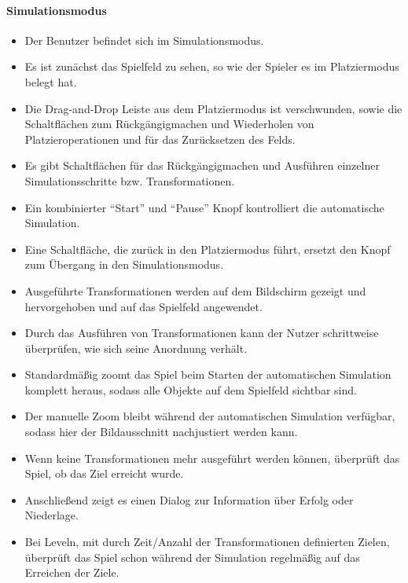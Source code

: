 \paragraph{Simulationsmodus}\mbox{}\newline
\begin{itemize}
\item Der Benutzer befindet sich im Simulationsmodus.
\item Es ist zunächst das Spielfeld zu sehen, so wie der Spieler es im Platziermodus belegt hat.
\item Die Drag-and-Drop Leiste aus dem Platziermodus ist verschwunden, sowie die 
Schaltflächen zum Rückgängigmachen und Wiederholen von 
Platzieroperationen und für das Zurücksetzen des Felds.
\item Es gibt Schaltflächen für das Rückgängigmachen und Ausführen 
einzelner Simulationsschritte bzw. Transformationen.
\item Ein kombinierter ``Start'' und ``Pause'' Knopf kontrolliert die automatische Simulation.
\item Eine Schaltfläche, die zurück in den Platziermodus führt, ersetzt den Knopf zum Übergang 
in den Simulationsmodus.
\item Ausgeführte Transformationen werden auf dem Bildschirm gezeigt und hervorgehoben und auf das Spielfeld angewendet.
\item Durch das Ausführen von Transformationen kann der Nutzer schrittweise
überprüfen, wie sich seine Anordnung verhält.
\item Standardmäßig zoomt das Spiel beim Starten der automatischen Simulation komplett heraus, sodass alle Objekte auf dem Spielfeld sichtbar sind.
\item Der manuelle Zoom bleibt während der automatischen Simulation verfügbar, sodass hier der Bildausschnitt nachjustiert werden kann.
\item Wenn keine Transformationen mehr ausgeführt werden können, überprüft das Spiel, ob das Ziel erreicht
wurde.
\item Anschließend zeigt es einen Dialog zur Information über Erfolg oder Niederlage.
\item Bei Leveln, mit durch Zeit/Anzahl der Transformationen definierten Zielen,
überprüft das Spiel schon während der Simulation regelmäßig auf das Erreichen
der Ziele.
\end{itemize}

